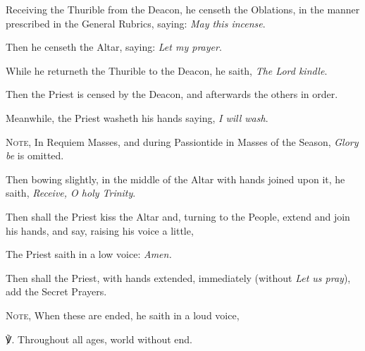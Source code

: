 \begin{multicols}{2}
\begin{rubric}
\end{rubric}
\begin{rubric}
    Receiving the Thurible from the Deacon, he censeth the Oblations, in the manner prescribed in the General Rubrics, saying: \emph{May this incense}.\par
    Then he censeth the Altar, saying: \emph{Let my prayer}.\par
    While he returneth the Thurible to the Deacon, he saith, \emph{The Lord kindle}.\par
    Then the Priest is censed by the Deacon, and afterwards the others in order.
\end{rubric}
\begin{rubric}
    Meanwhile, the Priest washeth his hands saying, \emph{I will wash}.\par
    \textsc{Note,} In Requiem Masses, and during Passiontide in Masses of the Season, \emph{Glory be} is omitted.
\end{rubric}
\begin{rubric}
    Then bowing slightly, in the middle of the Altar with hands joined upon it, he saith, \emph{Receive, O holy Trinity}.
\end{rubric}
\end{multicols}
\begin{rubric}
    Then shall the Priest kiss the Altar and, turning to the People, extend and join his hands, and say, raising his voice a little,
\end{rubric}
\begin{rubric}
    The Priest saith in a low voice: \emph{Amen.}
\end{rubric}
\begin{rubric}
	Then shall the Priest, with hands extended, immediately (without \emph{Let us pray}), add the Secret Prayers.\par
	\textsc{Note,} When these are ended, he saith in a loud voice,
\end{rubric}
℣. Throughout all ages, world without end.\par
